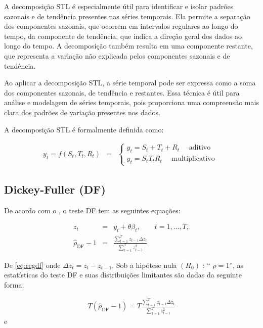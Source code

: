 A decomposição STL é especialmente útil para identificar e isolar padrões sazonais e de tendência presentes nas séries temporais. Ela permite a separação dos componentes sazonais, que ocorrem em intervalos regulares ao longo do tempo, da componente de tendência, que indica a direção geral dos dados ao longo do tempo. A decomposição também resulta em uma componente restante, que representa a variação não explicada pelos componentes sazonais e de tendência.

Ao aplicar a decomposição STL, a série temporal pode ser expressa como a soma dos componentes sazonais, de tendência e restantes. Essa técnica é útil para análise e modelagem de séries temporais, pois proporciona uma compreensão mais clara dos padrões de variação presentes nos dados.

A decomposição STL é formalmente definida como:

\begin{eqnarray}
	y_t=f\left(S_t, T_t, R_t\right)&=&\left\{\begin{array}{l}
		y_t=S_t+T_t+R_t \quad \text { aditivo } \\
		y_t=S_t T_t R_t \quad \text { multiplicativo }
	\end{array}\right. \label{eq:stl}
\end{eqnarray}

\subsection{Dickey-Fuller (DF)}

De acordo com o , o teste DF tem as seguintes equações:

\begin{eqnarray}
	z_t&=& y_t+\theta \beta_t, \qquad t=1,\ldots, T, \label{eq:df3}\\	
	\hat{\rho}_{\mathrm{DF}}-1&=&\frac{\sum_{t=1}^T z_{t-1} \Delta z_t}{\sum_{t=1}^T z_{t-1}^2} \label{eq:regdf}
\end{eqnarray}

De \eqref{eq:regdf} onde $\Delta z_t=z_t-z_{t-1}$. Sob a hipótese nula $\left(H_0\right)$ : `` $\rho=1$'', as estatísticas do teste DF e suas distribuições limitantes são dadas da seguinte forma:


\begin{eqnarray}
	T\left(\hat{\rho}_{\mathrm{DF}}-1\right)=T \frac{\sum_{t=1}^T z_{t-1} \Delta z_t}{\sum_{t=1}^T z_{t-1}^2}
\end{eqnarray}
e


